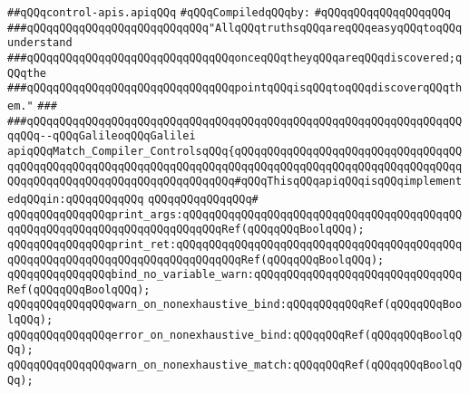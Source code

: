 \label{src/lib/compiler/toplevel/main/control-apis.api}
\verb|##qQQqcontrol-apis.apiqQQq|\newline
\newline
\verb|#qQQqCompiledqQQqby:|\newline
\verb|#qQQqqQQqqQQqqQQqqQQq|\newline
\newline
\newline
\newline
\verb|###qQQqqQQqqQQqqQQqqQQqqQQqqQQq"AllqQQqtruthsqQQqareqQQqeasyqQQqtoqQQqunderstand|\newline
\verb|###qQQqqQQqqQQqqQQqqQQqqQQqqQQqqQQqonceqQQqtheyqQQqareqQQqdiscovered;qQQqthe|\newline
\verb|###qQQqqQQqqQQqqQQqqQQqqQQqqQQqqQQqpointqQQqisqQQqtoqQQqdiscoverqQQqthem."|\newline
\verb|###|\newline
\verb|###qQQqqQQqqQQqqQQqqQQqqQQqqQQqqQQqqQQqqQQqqQQqqQQqqQQqqQQqqQQqqQQqqQQqqQQq--qQQqGalileoqQQqGalilei|\newline
\newline
\newline
\newline
\verb|apiqQQqMatch_Compiler_ControlsqQQq{qQQqqQQqqQQqqQQqqQQqqQQqqQQqqQQqqQQqqQQqqQQqqQQqqQQqqQQqqQQqqQQqqQQqqQQqqQQqqQQqqQQqqQQqqQQqqQQqqQQqqQQqqQQqqQQqqQQqqQQqqQQqqQQqqQQqqQQqqQQq#qQQqThisqQQqapiqQQqisqQQqimplementedqQQqin:qQQqqQQqqQQq|\newline
\verb|qQQqqQQqqQQqqQQq#|\newline
\verb|qQQqqQQqqQQqqQQqprint_args:qQQqqQQqqQQqqQQqqQQqqQQqqQQqqQQqqQQqqQQqqQQqqQQqqQQqqQQqqQQqqQQqqQQqqQQqqQQqRef(qQQqqQQqBoolqQQq);|\newline
\verb|qQQqqQQqqQQqqQQqprint_ret:qQQqqQQqqQQqqQQqqQQqqQQqqQQqqQQqqQQqqQQqqQQqqQQqqQQqqQQqqQQqqQQqqQQqqQQqqQQqqQQqRef(qQQqqQQqBoolqQQq);|\newline
\verb|qQQqqQQqqQQqqQQqbind_no_variable_warn:qQQqqQQqqQQqqQQqqQQqqQQqqQQqqQQqRef(qQQqqQQqBoolqQQq);|\newline
\verb|qQQqqQQqqQQqqQQqwarn_on_nonexhaustive_bind:qQQqqQQqqQQqRef(qQQqqQQqBoolqQQq);|\newline
\verb|qQQqqQQqqQQqqQQqerror_on_nonexhaustive_bind:qQQqqQQqRef(qQQqqQQqBoolqQQq);|\newline
\verb|qQQqqQQqqQQqqQQqwarn_on_nonexhaustive_match:qQQqqQQqRef(qQQqqQQqBoolqQQq);|\newline
